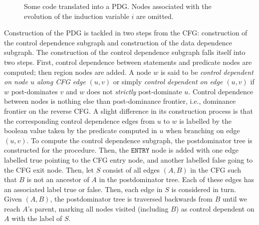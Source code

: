 \begin{figure}
\centering
{}
\caption{Some code translated into a PDG. Nodes associated with the evolution of the induction variable $i$ are omitted.}
\label{fig:pdg}
\end{figure}

Construction of the PDG is tackled in two steps from the CFG: construction of the control dependence subgraph and construction of the data dependence subgraph.
The construction of the control dependence subgraph falls itself into two steps. First, control dependence between statements and predicate nodes are computed; then region nodes are added. A node $w$ is said to be \emph{control dependent on node $u$ along CFG edge $(u,v)$} or simply \emph{control dependent on edge $(u,v)$} if $w$ post-dominates $v$ and $w$ does not \emph{strictly} post-dominate $u$. Control dependence between nodes is nothing else than post-dominance frontier, i.e., dominance frontier on the reverse CFG. A slight difference in its construction process is that the corresponding control dependence edges from $u$ to $w$ is labelled by the boolean value taken by the predicate computed in $u$ when branching on edge $(u,v)$. To compute the control dependence subgraph, the postdominator tree is constructed for the procedure. Then, the $\texttt{ENTRY}$ node is added with one edge labelled {\sf true} pointing to the CFG entry node, and another labelled {\sf false} going to the CFG exit node. Then, let $S$ consist of all edges $(A,B)$ in the CFG such that $B$ is not an ancestor of $A$ in the postdominator tree. Each of these edges has an associated label {\sf true} or {\sf false}. Then, each edge in $S$ is considered in turn. Given $(A,B)$, the postdominator tree is traversed backwards from $B$ until we reach $A$'s parent, marking all nodes visited (including $B$) as control dependent on $A$ with the label of $S$.

